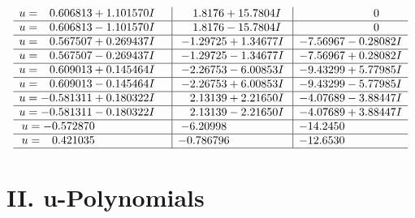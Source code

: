 \documentclass[1p]{elsarticle_modified}
\theoremstyle{definition}
\begin{document}
$$\begin{array}{c|c|c}
\begin{aligned}
u &= \phantom{-}0.606813 + 1.101570 I\end{aligned}
 & \phantom{-}1.8176 + 15.7804 I & \phantom{-0.000000 } 0 \\ \hline\begin{aligned}
u &= \phantom{-}0.606813 - 1.101570 I\end{aligned}
 & \phantom{-}1.8176 - 15.7804 I & \phantom{-0.000000 } 0 \\ \hline\begin{aligned}
u &= \phantom{-}0.567507 + 0.269437 I\end{aligned}
 & -1.29725 + 1.34677 I & -7.56967 - 0.28082 I \\ \hline\begin{aligned}
u &= \phantom{-}0.567507 - 0.269437 I\end{aligned}
 & -1.29725 - 1.34677 I & -7.56967 + 0.28082 I \\ \hline\begin{aligned}
u &= \phantom{-}0.609013 + 0.145464 I\end{aligned}
 & -2.26753 - 6.00853 I & -9.43299 + 5.77985 I \\ \hline\begin{aligned}
u &= \phantom{-}0.609013 - 0.145464 I\end{aligned}
 & -2.26753 + 6.00853 I & -9.43299 - 5.77985 I \\ \hline\begin{aligned}
u &= -0.581311 + 0.180322 I\end{aligned}
 & \phantom{-}2.13139 + 2.21650 I & -4.07689 - 3.88447 I \\ \hline\begin{aligned}
u &= -0.581311 - 0.180322 I\end{aligned}
 & \phantom{-}2.13139 - 2.21650 I & -4.07689 + 3.88447 I \\ \hline\begin{aligned}
u &= -0.572870\phantom{ +0.000000I}\end{aligned}
 & -6.20998\phantom{ +0.000000I} & -14.2450\phantom{ +0.000000I} \\ \hline\begin{aligned}
u &= \phantom{-}0.421035\phantom{ +0.000000I}\end{aligned}
 & -0.786796\phantom{ +0.000000I} & -12.6530\phantom{ +0.000000I}\\
 \hline 
 \end{array}$$\newpage
\newpage\renewcommand{\arraystretch}{1}
\centering \section*{ II. u-Polynomials}
\end{document}
